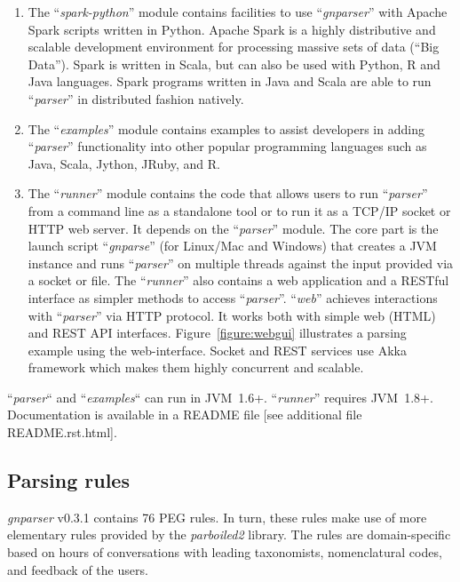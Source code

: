 \documentclass{bmcart}
\begin{document}
\begin{enumerate}
\begin{itemize}
\end{itemize}

  \item The ``\textit{spark-python}'' module contains facilities to use ``\textit{gnparser}'' with Apache Spark scripts written in Python. Apache Spark is a highly distributive and scalable development environment for processing massive sets of data (``Big Data''). Spark is written in Scala, but can also be used with Python, R and Java languages. Spark programs written in Java and Scala are able to run ``\textit{parser}'' in distributed fashion natively.

  \item The ``\textit{examples}'' module contains examples to assist developers in adding ``\textit{parser}'' functionality into other popular programming languages such as Java, Scala, Jython, JRuby, and R.

  \item The ``\textit{runner}'' module contains the code that allows users to run ``\textit{parser}'' from a command line as a standalone tool or to run it as a TCP/IP socket or HTTP web server. It depends on the ``\textit{parser}'' module. The core part is the launch script ``\textit{gnparse}'' (for Linux/Mac and Windows) that creates a JVM instance and runs ``\textit{parser}'' on multiple threads against the input provided via a socket or file. The ``\textit{runner}'' also contains a web application and a RESTful interface as simpler methods to access ``\textit{parser}''. ``\textit{web}'' achieves interactions with ``\textit{parser}'' via HTTP protocol. It works both with simple web (HTML) and REST API interfaces. Figure~\ref{figure:webgui} illustrates a parsing example using the web-interface. Socket and REST services use Akka framework which makes them highly concurrent and scalable.

\end{enumerate}

``\textit{parser}`` and ``\textit{examples}`` can run in JVM~1.6+.  ``\textit{runner}'' requires JVM~1.8+. Documentation is available in a README file [see additional file README.rst.html].

\subsection*{Parsing rules}


\textit{gnparser} v0.3.1 contains 76 PEG rules. In turn, these rules make use of more elementary rules provided by the \textit{parboiled2} library. The rules are domain-specific based on hours of conversations with leading taxonomists, nomenclatural codes, and feedback of the users.
\end{document}
